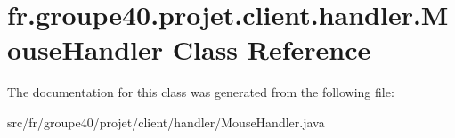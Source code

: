 \hypertarget{classfr_1_1groupe40_1_1projet_1_1client_1_1handler_1_1_mouse_handler}{}\section{fr.\+groupe40.\+projet.\+client.\+handler.\+Mouse\+Handler Class Reference}
\label{classfr_1_1groupe40_1_1projet_1_1client_1_1handler_1_1_mouse_handler}


The documentation for this class was generated from the following file\+:\begin{DoxyCompactItemize}
\item 
src/fr/groupe40/projet/client/handler/Mouse\+Handler.\+java\end{DoxyCompactItemize}
